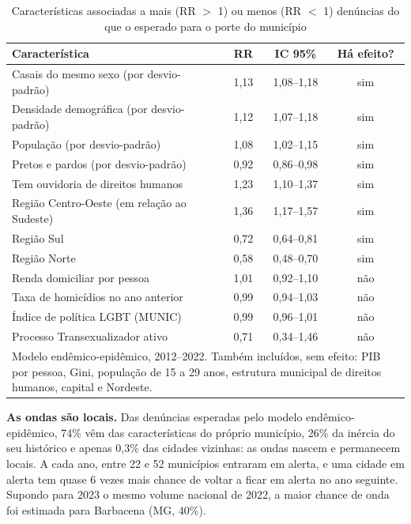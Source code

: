 \documentclass[12pt]{article}
\begin{document}
\begin{table}[!htb]
\centering
\caption{Características associadas a mais (RR $>$ 1) ou menos (RR $<$ 1) denúncias do que o esperado para o porte do município}
\label{tab:coef}
{\renewcommand{\arraystretch}{1.15}\small
\begin{tabular}{p{6.8cm} c c c}
\hline
\textbf{Característica} & \textbf{RR} & \textbf{IC 95\%} & \textbf{Há efeito?} \\
\hline
Casais do mesmo sexo (por desvio-padrão) & 1,13 & 1,08--1,18 & sim \\
Densidade demográfica (por desvio-padrão) & 1,12 & 1,07--1,18 & sim \\
População (por desvio-padrão) & 1,08 & 1,02--1,15 & sim \\
Pretos e pardos (por desvio-padrão) & 0,92 & 0,86--0,98 & sim \\
Tem ouvidoria de direitos humanos & 1,23 & 1,10--1,37 & sim \\
Região Centro-Oeste (em relação ao Sudeste) & 1,36 & 1,17--1,57 & sim \\
Região Sul & 0,72 & 0,64--0,81 & sim \\
Região Norte & 0,58 & 0,48--0,70 & sim \\
Renda domiciliar por pessoa & 1,01 & 0,92--1,10 & não \\
Taxa de homicídios no ano anterior & 0,99 & 0,94--1,03 & não \\
Índice de política LGBT (MUNIC) & 0,99 & 0,96--1,01 & não \\
Processo Transexualizador ativo & 0,71 & 0,34--1,46 & não \\
\hline
\multicolumn{4}{p{12cm}}{\footnotesize Modelo endêmico-epidêmico, 2012--2022. Também incluídos, sem efeito: PIB por pessoa, Gini, população de 15 a 29 anos, estrutura municipal de direitos humanos, capital e Nordeste.}
\end{tabular}}
\end{table}

\textbf{As ondas são locais.} Das denúncias esperadas pelo modelo endêmico-epidêmico, 74\% vêm das características do próprio município, 26\% da inércia do seu histórico e apenas 0,3\% das cidades vizinhas: as ondas nascem e permanecem locais. A cada ano, entre 22 e 52 municípios entraram em alerta, e uma cidade em alerta tem quase 6 vezes mais chance de voltar a ficar em alerta no ano seguinte. Supondo para 2023 o mesmo volume nacional de 2022, a maior chance de onda foi estimada para Barbacena (MG, 40\%).
\end{document}
